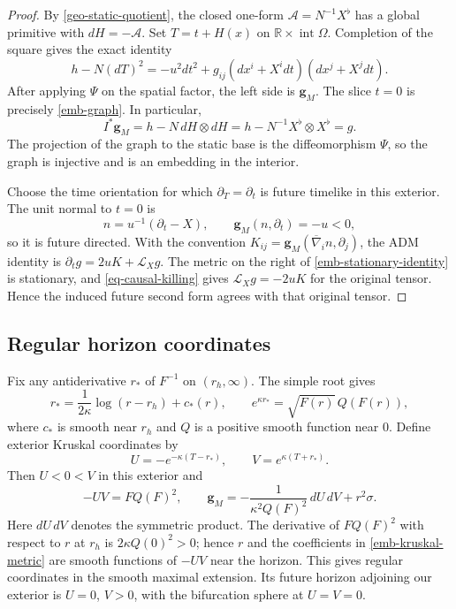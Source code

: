 \begin{proof}
By \cref{geo-static-quotient}, the closed one-form
$\mathcal A=N^{-1}X^\flat$ has a global primitive with
$dH=-\mathcal A$.  Set $T=t+H(x)$ on
$\mathbb R\times\operatorname{int}\Omega$.  Completion of the square
gives the exact identity
\begin{equation}
 h-N(dT)^2
 =-u^2dt^2+g_{ij}(dx^i+X^i dt)(dx^j+X^j dt).
 \label{emb-stationary-identity}
\end{equation}
After applying $\Psi$ on the spatial factor, the left side is
$\mathbf g_M$.  The slice $t=0$ is precisely \eqref{emb-graph}.
In particular,
\[
 I^*\mathbf g_M=h-N\,dH\otimes dH
              =h-N^{-1}X^\flat\otimes X^\flat=g.
\]
The projection of the graph to the static base is the diffeomorphism
$\Psi$, so the graph is injective and is an embedding in the interior.

Choose the time orientation for which $\partial_T=\partial_t$ is
future timelike in this exterior.  The unit normal to $t=0$ is
\[
 n=u^{-1}(\partial_t-X),
 \qquad
 \mathbf g_M(n,\partial_t)=-u<0,
\]
so it is future directed.  With the convention
$K_{ij}=\mathbf g_M(\overline\nabla_i n,\partial_j)$, the
ADM identity is
$\partial_tg=2uK+\mathcal L_Xg$.
The metric on the right of \eqref{emb-stationary-identity} is
stationary, and \cref{eq-causal-killing} gives
$\mathcal L_Xg=-2uK$ for the original tensor.  Hence the induced
future second form agrees with that original tensor.
\end{proof}

\subsection{Regular horizon coordinates}

Fix any antiderivative $r_*$ of $F^{-1}$ on $(r_h,\infty)$.
The simple root gives
\begin{equation}
 r_*=\frac1{2\kappa}\log(r-r_h)+c_*(r),
 \qquad
 e^{\kappa r_*}=\sqrt{F(r)}\,Q(F(r)),
 \label{emb-tortoise}
\end{equation}
where $c_*$ is smooth near $r_h$ and $Q$ is a positive smooth
function near $0$.  Define exterior Kruskal coordinates by
\begin{equation}
 U=-e^{-\kappa(T-r_*)},\qquad
 V=e^{\kappa(T+r_*)}.
 \label{emb-kruskal}
\end{equation}
Then $U<0<V$ in this exterior and
\begin{equation}
 -UV=FQ(F)^2,\qquad
 \mathbf g_M=-\frac1{\kappa^2Q(F)^2}\,dU\,dV+r^2\sigma .
 \label{emb-kruskal-metric}
\end{equation}
Here $dU\,dV$ denotes the symmetric product.  The derivative of
$FQ(F)^2$ with respect to $r$ at $r_h$ is
$2\kappa Q(0)^2>0$; hence $r$ and the coefficients in
\eqref{emb-kruskal-metric} are smooth functions of $-UV$ near
the horizon.  This gives regular coordinates in the smooth maximal
extension.  Its future horizon adjoining our exterior is
$U=0$, $V>0$, with the bifurcation sphere at $U=V=0$.

